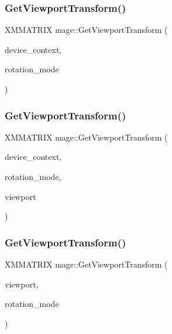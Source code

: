 \hypertarget{namespacemage_a2d37559381f62998ab660694c0e45d68}{}\label{namespacemage_a2d37559381f62998ab660694c0e45d68} 
\subsubsection{\texorpdfstring{Get\+Viewport\+Transform()}{GetViewportTransform()}\hspace{0.1cm}{\footnotesize\ttfamily [1/3]}}
{\footnotesize\ttfamily X\+M\+M\+A\+T\+R\+IX mage\+::\+Get\+Viewport\+Transform (\begin{DoxyParamCaption}\item[{I\+D3\+D11\+Device\+Context $\ast$}]{device\+\_\+context,  }\item[{D\+X\+G\+I\+\_\+\+M\+O\+D\+E\+\_\+\+R\+O\+T\+A\+T\+I\+ON}]{rotation\+\_\+mode }\end{DoxyParamCaption})}

\hypertarget{namespacemage_a07ec7b3cc09d526542d3c5ea7e17595a}{}\label{namespacemage_a07ec7b3cc09d526542d3c5ea7e17595a} 
\subsubsection{\texorpdfstring{Get\+Viewport\+Transform()}{GetViewportTransform()}\hspace{0.1cm}{\footnotesize\ttfamily [2/3]}}
{\footnotesize\ttfamily X\+M\+M\+A\+T\+R\+IX mage\+::\+Get\+Viewport\+Transform (\begin{DoxyParamCaption}\item[{I\+D3\+D11\+Device\+Context $\ast$}]{device\+\_\+context,  }\item[{D\+X\+G\+I\+\_\+\+M\+O\+D\+E\+\_\+\+R\+O\+T\+A\+T\+I\+ON}]{rotation\+\_\+mode,  }\item[{D3\+D11\+\_\+\+V\+I\+E\+W\+P\+O\+RT $\ast$$\ast$}]{viewport }\end{DoxyParamCaption})}

\hypertarget{namespacemage_a0191746ac9322d40db5863b59624719a}{}\label{namespacemage_a0191746ac9322d40db5863b59624719a} 
\subsubsection{\texorpdfstring{Get\+Viewport\+Transform()}{GetViewportTransform()}\hspace{0.1cm}{\footnotesize\ttfamily [3/3]}}
{\footnotesize\ttfamily X\+M\+M\+A\+T\+R\+IX mage\+::\+Get\+Viewport\+Transform (\begin{DoxyParamCaption}\item[{const D3\+D11\+\_\+\+V\+I\+E\+W\+P\+O\+RT \&}]{viewport,  }\item[{D\+X\+G\+I\+\_\+\+M\+O\+D\+E\+\_\+\+R\+O\+T\+A\+T\+I\+ON}]{rotation\+\_\+mode }\end{DoxyParamCaption})}

